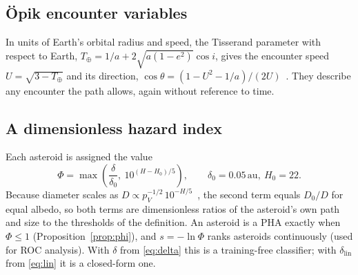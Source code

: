 \documentclass[make,article,submit,moreauthors]{Definitions/mdpi}
\newcommand{\au}{\,\mathrm{au}}
\begin{document}
\subsection{\"{O}pik encounter variables}
In units of Earth's orbital radius and speed, the Tisserand parameter with respect to Earth, $T_\oplus = 1/a + 2\sqrt{a(1-e^2)}\cos i$, gives the encounter speed $U = \sqrt{3 - T_\oplus}$ and its direction, $\cos\theta = (1 - U^2 - 1/a)/(2U)$~\cite{opik1976,valsecchi2003}. They describe any encounter the path allows, again without reference to time.

\subsection{A dimensionless hazard index}
Each asteroid is assigned the value
\begin{equation}
\Phi = \max\!\left( \frac{\delta}{\delta_0},\ 10^{(H - H_0)/5} \right), \qquad \delta_0 = 0.05\au,\ H_0 = 22 .
\label{eq:phi}
\end{equation}
Because diameter scales as $D \propto p_V^{-1/2}\,10^{-H/5}$~\cite{pravec2007}, the second term equals $D_0/D$ for equal albedo, so both terms are dimensionless ratios of the asteroid's own path and size to the thresholds of the definition. An asteroid is a PHA exactly when $\Phi \le 1$ (Proposition~\ref{prop:phi}), and $s = -\ln\Phi$ ranks asteroids continuously (used for ROC analysis). With $\delta$ from \eqref{eq:delta} this is a training-free classifier; with $\delta_{\mathrm{lin}}$ from \eqref{eq:lin} it is a closed-form one.
\end{document}
